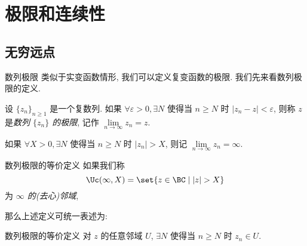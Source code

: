\section{极限和连续性}


\subsection{无穷远点}
\begin{frame}{数列极限}
	\onslide<+->
	类似于实变函数情形, 我们可以定义复变函数的极限.
	\onslide<+->
	我们先来看数列极限的定义.
	\onslide<+->
	\begin{definition}
		设 $\{z_n\}_{n\ge 1}$ 是一个复数列.
		如果 $\forall \varepsilon>0,\exists N$ 使得当 $n\ge N$ 时 $|z_n-z|<\varepsilon$, 则称 $z$ 是\emph{数列 $\{z_n\}$ 的极限}, 记作 \emph{$\lim\limits_{n\to\infty}z_n=z$}.
	\end{definition}
	\onslide<+->
	如果 $\forall X>0,\exists N$ 使得当 $n\ge N$ 时 $|z_n|>X$, 则记 $\lim\limits_{n\to\infty}z_n=\infty$.
\end{frame}


\begin{frame}{数列极限的等价定义}
	\onslide<+->
	如果我们称
	\[\Uc(\infty,X)=\set{z\in\BC\mid|z|>X}\]
	为 \emph{$\infty$ 的(去心)邻域},
	\onslide<+->
	\begin{center}
	\end{center}
	\onslide<+->
	那么上述定义可统一表述为:

	\onslide<+->
	\begin{third}{数列极限的等价定义}
		对 $z$ 的任意邻域 $U$, $\exists N$ 使得当 $n\ge N$ 时 $z_n\in U$.
	\end{third}
\end{frame}


